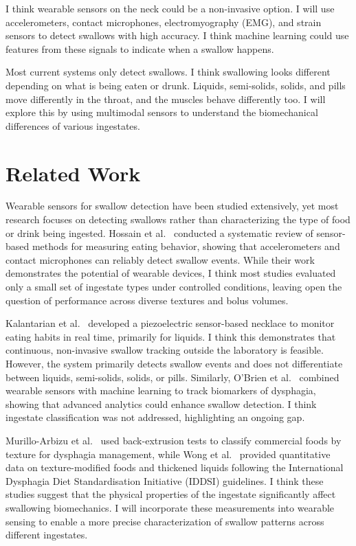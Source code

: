 \documentclass[conference]{IEEEtran}
\begin{document}
I think wearable sensors on the neck could be a non-invasive option. I will use accelerometers, contact microphones, electromyography (EMG), and strain sensors to detect swallows with high accuracy. I think machine learning could use features from these signals to indicate when a swallow happens.

Most current systems only detect swallows. I think swallowing looks different depending on what is being eaten or drunk. Liquids, semi-solids, solids, and pills move differently in the throat, and the muscles behave differently too. I will explore this by using multimodal sensors to understand the biomechanical differences of various ingestates.

\section{Related Work}

Wearable sensors for swallow detection have been studied extensively, yet most research focuses on detecting swallows rather than characterizing the type of food or drink being ingested. Hossain et al.~\cite{1} conducted a systematic review of sensor-based methods for measuring eating behavior, showing that accelerometers and contact microphones can reliably detect swallow events. While their work demonstrates the potential of wearable devices, I think most studies evaluated only a small set of ingestate types under controlled conditions, leaving open the question of performance across diverse textures and bolus volumes.

Kalantarian et al.~\cite{2} developed a piezoelectric sensor-based necklace to monitor eating habits in real time, primarily for liquids. I think this demonstrates that continuous, non-invasive swallow tracking outside the laboratory is feasible. However, the system primarily detects swallow events and does not differentiate between liquids, semi-solids, solids, or pills. Similarly, O’Brien et al.~\cite{3} combined wearable sensors with machine learning to track biomarkers of dysphagia, showing that advanced analytics could enhance swallow detection. I think ingestate classification was not addressed, highlighting an ongoing gap.

Murillo-Arbizu et al.~\cite{4} used back-extrusion tests to classify commercial foods by texture for dysphagia management, while Wong et al.~\cite{5} provided quantitative data on texture-modified foods and thickened liquids following the International Dysphagia Diet Standardisation Initiative (IDDSI) guidelines. I think these studies suggest that the physical properties of the ingestate significantly affect swallowing biomechanics. I will incorporate these measurements into wearable sensing to enable a more precise characterization of swallow patterns across different ingestates.
\end{document}
